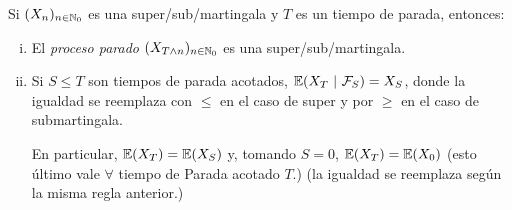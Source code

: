 \begin{theorem}
	Si $(X_{n})_{n \in \mathbb{N}_{0}}$ es una super/sub/martingala y $T$ es un tiempo de parada, entonces:
	\begin{enumerate}[i)]
		\item El \textit{proceso parado} $(X_{T \wedge n})_{n \in \mathbb{N}_{0}}$ es una super/sub/martingala.

		\item Si $S \leq T$ son tiempos de parada acotados, $\mathbb{E}(X_{T} \ | \ \mathcal{F}_{S}) = X_{S}$, donde la igualdad se reemplaza con $\leq$ en el caso de super y por $\geq$ en el caso de submartingala. \par
		En particular, $\mathbb{E}(X_{T}) = \mathbb{E}(X_{S})$ y, tomando $S=0$, $\mathbb{E}(X_{T}) = \mathbb{E}(X_{0})$ (esto último vale $\forall $ tiempo de Parada acotado $T$.) (la igualdad se reemplaza según la misma regla anterior.)
	\end{enumerate}
\end{theorem}

